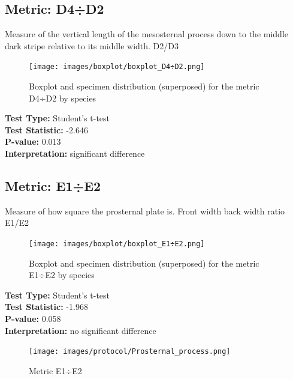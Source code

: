 \newpage
\subsection*{Metric: D4÷D2}

Measure of the vertical length of the mesosternal process down to the middle dark stripe  relative to its middle width. D2/D3

\begin{figure}[H]
\centering
\texttt{[image: images/boxplot/boxplot\_D4÷D2.png]}
\caption{  Boxplot and specimen distribution (superposed) for the metric  D4÷D2 by species}
\end{figure}

\noindent\textbf{Test Type:} Student's t-test \\
\noindent\textbf{Test Statistic:} -2.646 \\
\noindent\textbf{P-value:} 0.013 \\
\noindent\textbf{Interpretation:} significant difference

\newpage
\subsection*{Metric: E1÷E2}

Measure of how square the prosternal plate is. Front width back width ratio E1/E2

\begin{figure}[H]
\centering
\texttt{[image: images/boxplot/boxplot\_E1÷E2.png]}
\caption{  Boxplot and specimen distribution (superposed) for the metric  E1÷E2 by species}
\end{figure}

\noindent\textbf{Test Type:} Student's t-test \\
\noindent\textbf{Test Statistic:} -1.968 \\
\noindent\textbf{P-value:} 0.058 \\
\noindent\textbf{Interpretation:} no significant difference

\begin{figure}[H]
\centering
\texttt{[image: images/protocol/Prosternal\_process.png]}
\caption{ Metric E1÷E2}
\end{figure}

\newpage

